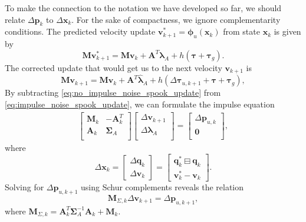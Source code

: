 \documentclass[preprint,12pt]{elsarticle}
\let\vec\bm
\let\mat\mathbf
\let\amssymbboxminus\boxminus
\renewcommand{\boxminus}{\mathbin{\mathop\amssymbboxminus}}
\numberwithin{equation}{section}
\def\conf{q}
\def\jaca{\mat{A}}
\def\step{\phi}
\begin{document}
To make the connection to the notation we have developed so far, we should relate $\Delta \vec{p}_k$ to $\Delta \vec{x}_k$.
For the sake of compactness, we ignore complementarity conditions. The predicted velocity update $\vec{v}_{k+1}^* = \vec{\step}_u(\vec{x}_k)$ from state $\vec{x}_k$ is given by 
\begin{equation}
    \label{eq:no_impulse_noise_spook_update}
    \mat{M} \vec{v}_{k+1}^* = \mat{M} \vec{v}_k + \mat{A}^T \vec{\lambda}_A + h(\vec{\tau} + \vec{\tau}_g).    
\end{equation}
The corrected update that would get us to the next velocity $\vec{v}_{k+1}$ is
\begin{equation}
    \label{eq:impulse_noise_spook_update}
    \mat{M} \vec{v}_{k+1} = \mat{M} \vec{v}_k + \mat{A}^T \hat{\vec{\lambda}}_A + h(\Delta \vec{\tau}_{u,k+1}+ \vec{\tau} + \vec{\tau}_g),
\end{equation}
By subtracting \eqref{eq:no_impulse_noise_spook_update} from \eqref{eq:impulse_noise_spook_update}, we can formulate the impulse equation
\begin{equation}
    \begin{aligned}
        \begin{bmatrix}
            \mat{M}_k & -\jaca_k^T  \\
            \jaca_k & \mat{\Sigma}_A   \\
        \end{bmatrix}
        \begin{bmatrix}
            \Delta \vec{v}_{k+1}   \\
            \Delta \vec{\lambda}_A \\
        \end{bmatrix}
        =
        \begin{bmatrix}
            \Delta \vec{p}_{u,k} \\
            \vec{0} \\
        \end{bmatrix},
    \end{aligned}
\end{equation}
where 
\begin{equation}
    \Delta \vec{x}_k = \begin{bmatrix}
        \Delta \vec{\conf}_k \\
        \Delta \vec{v}_k
    \end{bmatrix}
    =
    \begin{bmatrix}
        \vec{\conf}_k^* \boxminus \vec{\conf}_k \\
        \vec{v}_k^* - \vec{v}_k
    \end{bmatrix}.
\end{equation}
Solving for $\Delta \vec{p}_{u,k+1}$ using Schur complements reveals the relation
\begin{equation}
    \label{eq:velocity_force_relation}
    \mat{M}_{\Sigma,k} \Delta \vec{v}_{k+1} = \Delta \vec{p}_{u,k+1},
\end{equation}
where $\mat{M}_{\Sigma,k} = \mat{A}_k^T \mat{\Sigma}^{-1}_A \mat{A}_k + \mat{M}_k$.
\end{document}
